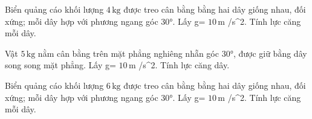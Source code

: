 \begin{bt}
Biển quảng cáo khối lượng $4\,\text{kg}$ được treo cân bằng bằng hai dây giống nhau, đối xứng; mỗi dây hợp với phương ngang góc 30°. Lấy g= $10\,\text{m}$ /s^2. Tính lực căng mỗi dây.
\end{bt}

\begin{bt}
Vật $5\,\text{kg}$ nằm cân bằng trên mặt phẳng nghiêng nhẵn góc 30°, được giữ bằng dây song song mặt phẳng. Lấy g= $10\,\text{m}$ /s^2. Tính lực căng dây.
\end{bt}

\begin{bt}
Biển quảng cáo khối lượng $6\,\text{kg}$ được treo cân bằng bằng hai dây giống nhau, đối xứng; mỗi dây hợp với phương ngang góc 30°. Lấy g= $10\,\text{m}$ /s^2. Tính lực căng mỗi dây.
\end{bt}
